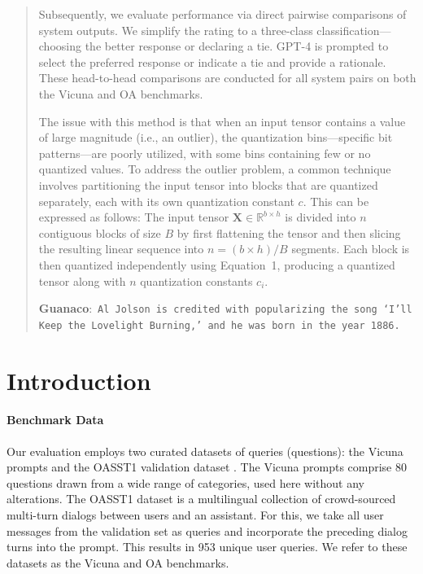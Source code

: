 \begin{quote}
Subsequently, we evaluate performance via direct pairwise comparisons of system outputs. We simplify the rating to a three-class classification—choosing the better response or declaring a tie. GPT-4 is prompted to select the preferred response or indicate a tie and provide a rationale. These head-to-head comparisons are conducted for all system pairs on both the Vicuna and OA benchmarks.

The issue with this method is that when an input tensor contains a value of large magnitude (i.e., an outlier), the quantization bins—specific bit patterns—are poorly utilized, with some bins containing few or no quantized values. To address the outlier problem, a common technique involves partitioning the input tensor into blocks that are quantized separately, each with its own quantization constant $c$. This can be expressed as follows: The input tensor $\mathbf{X}\in \mathbb{R}^{b\times h}$ is divided into $n$ contiguous blocks of size $B$ by first flattening the tensor and then slicing the resulting linear sequence into ${n = ({b\times h} )/{B} }$ segments. Each block is then quantized independently using Equation~1, producing a quantized tensor along with $n$ quantization constants $c_i$.

     \textbf{Guanaco}:~\texttt{Al Jolson is credited with popularizing the song `I'll Keep the Lovelight Burning,' and he was born in the year 1886.}
 \end{quote}

\section{Introduction}

\paragraph{Benchmark Data} Our evaluation employs two curated datasets of queries (questions): the Vicuna prompts \citep{vicuna2023} and the OASST1 validation dataset \citep{kopf2023openassistant}. The Vicuna prompts comprise 80 questions drawn from a wide range of categories, used here without any alterations. The OASST1 dataset is a multilingual collection of crowd-sourced multi-turn dialogs between users and an assistant. For this, we take all user messages from the validation set as queries and incorporate the preceding dialog turns into the prompt. This results in 953 unique user queries. We refer to these datasets as the Vicuna and OA benchmarks.


